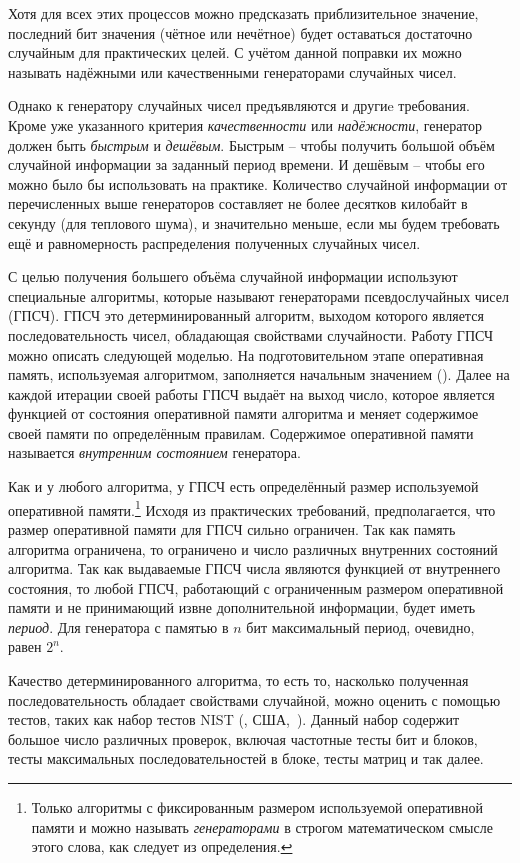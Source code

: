 Хотя для всех этих процессов можно предсказать приблизительное значение, последний бит значения (чётное или нечётное) будет оставаться достаточно случайным для практических целей. С учётом данной поправки их можно называть надёжными или качественными генераторами случайных чисел.

Однако к генератору случайных чисел предъявляются и другиe требования. Кроме уже указанного критерия \emph{качественности} или \emph{надёжности}, генератор должен быть \emph{быстрым} и \emph{дешёвым}. Быстрым -- чтобы получить большой объём случайной информации за заданный период времени. И дешёвым -- чтобы его можно было бы использовать на практике. Количество случайной информации от перечисленных выше генераторов составляет не более десятков килобайт в секунду (для теплового шума), и значительно меньше, если мы будем требовать ещё и равномерность распределения полученных случайных чисел.

С целью получения большего объёма случайной информации используют специальные алгоритмы, которые называют генераторами псевдослучайных чисел (ГПСЧ). ГПСЧ это детерминированный алгоритм, выходом которого является последовательность чисел, обладающая свойствами случайности. Работу ГПСЧ можно описать следующей моделью. На подготовительном этапе оперативная память, используемая алгоритмом, заполняется начальным значением (). Далее на каждой итерации своей работы ГПСЧ выдаёт на выход число, которое является функцией от состояния оперативной памяти алгоритма и меняет содержимое своей памяти по определённым правилам. Содержимое оперативной памяти называется \emph{внутренним состоянием} генератора.

Как и у любого алгоритма, у ГПСЧ есть определённый размер используемой оперативной памяти.\footnote{Только алгоритмы с фиксированным размером используемой оперативной памяти и можно называть \emph{генераторами} в строгом математическом смысле этого слова, как следует из определения.} Исходя из практических требований, предполагается, что размер оперативной памяти для ГПСЧ сильно ограничен. Так как память алгоритма ограничена, то ограничено и число различных внутренних состояний алгоритма. Так как выдаваемые ГПСЧ числа являются функцией от внутреннего состояния, то любой ГПСЧ, работающий с ограниченным размером оперативной памяти и не принимающий извне дополнительной информации, будет иметь \emph{период}. Для генератора с памятью в $n$ бит максимальный период, очевидно, равен $2^n$.

Качество детерминированного алгоритма, то есть то, насколько полученная последовательность обладает свойствами случайной, можно оценить с помощью тестов, таких как набор тестов NIST (, США,~\cite{NIST:2001}). Данный набор содержит большое число различных проверок, включая частотные тесты бит и блоков, тесты максимальных последовательностей в блоке, тесты матриц и так далее.

